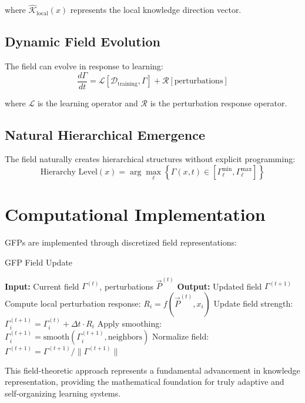 where $\hat{\mathcal{K}}_{\text{local}}(x)$ represents the local knowledge direction vector.

\subsection{Dynamic Field Evolution}

The field can evolve in response to learning:
\begin{equation}
\frac{d\Gamma}{dt} = \mathcal{L}[\mathcal{D}_{\text{training}}, \Gamma] + \mathcal{R}[\text{perturbations}]
\end{equation}

where $\mathcal{L}$ is the learning operator and $\mathcal{R}$ is the perturbation response operator.

\subsection{Natural Hierarchical Emergence}

The field naturally creates hierarchical structures without explicit programming:
\begin{equation}
\text{Hierarchy Level}(x) = \arg\max_{\ell} \left\{ \Gamma(x,t) \in [\Gamma_{\ell}^{\min}, \Gamma_{\ell}^{\max}] \right\}
\end{equation}

\section{Computational Implementation}

GFPs are implemented through discretized field representations:

\begin{algorithm}
\caption{GFP Field Update}
\begin{algorithmic}[1]
\State \textbf{Input:} Current field $\Gamma^{(t)}$, perturbations $\vec{P}^{(t)}$
\State \textbf{Output:} Updated field $\Gamma^{(t+1)}$
    \State Compute local perturbation response: $R_i = f(\vec{P}^{(t)}, x_i)$
    \State Update field strength: $\Gamma^{(t+1)}_i = \Gamma^{(t)}_i + \Delta t \cdot R_i$
    \State Apply smoothing: $\Gamma^{(t+1)}_i = \text{smooth}(\Gamma^{(t+1)}_i, \text{neighbors})$
\EndFor
\State Normalize field: $\Gamma^{(t+1)} = \Gamma^{(t+1)} / \|\Gamma^{(t+1)}\|$
\end{algorithmic}
\end{algorithm}

This field-theoretic approach represents a fundamental advancement in knowledge representation, providing the mathematical foundation for truly adaptive and self-organizing learning systems.